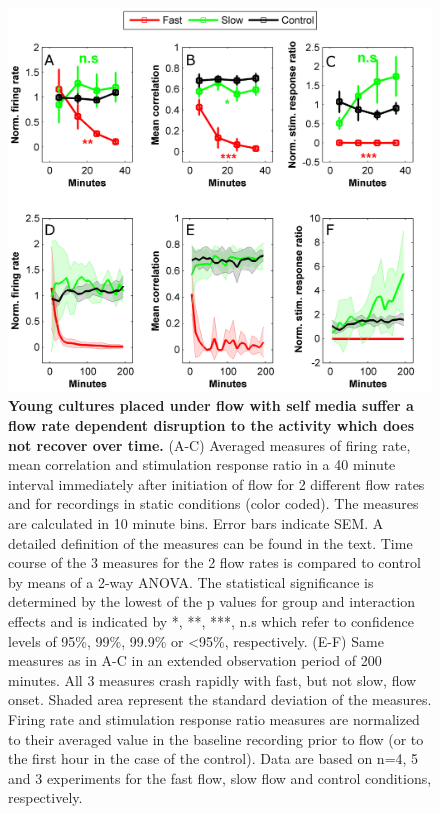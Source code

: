         \begin{figure}[!htb]
            \centering
            \includegraphics[width=15cm]{chapter5/figures/slowFastStats/slowFastStats.jpg}
            \caption[Averaged time course of activity measures in young cultures placed under flow at different rates]{\textbf{Young cultures placed under flow with self media suffer a flow rate dependent disruption to the activity which does not recover over time.} (A-C) Averaged measures of firing rate, mean correlation and stimulation response ratio in a 40 minute interval immediately after initiation of flow for 2 different flow rates and for recordings in static conditions (color coded). The measures are calculated in 10 minute bins. Error bars indicate SEM. A detailed definition of the measures can be found in the text. Time course of the 3 measures for the 2 flow rates is compared to control by means of a 2-way ANOVA. The statistical significance is determined by the lowest of the p values for group and interaction effects and is indicated by *, **, ***, n.s which refer to confidence levels of 95\%, 99\%, 99.9\% or \textless95\%, respectively. (E-F) Same measures as in A-C in an extended observation period of 200 minutes. All 3 measures crash rapidly with fast, but not slow, flow onset. Shaded area represent the standard deviation of the measures. Firing rate and stimulation response ratio measures are normalized to their averaged value in the baseline recording prior to flow (or to the first hour in the case of the control). Data are based on n=4, 5 and 3 experiments for the fast flow, slow flow and control conditions, respectively.}
            \label{fig:crossFlow:slowFastStats}
        \end{figure}



